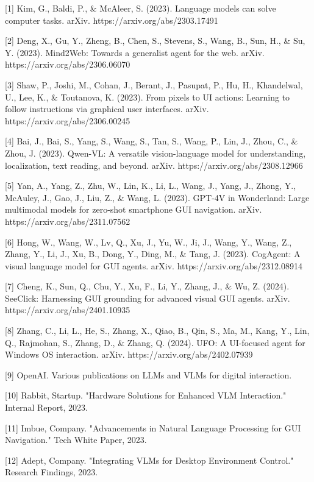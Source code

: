 \documentclass{article}
\begin{document}
{
\small
[1] Kim, G., Baldi, P., \& McAleer, S. (2023). Language models can solve computer tasks. arXiv. https://arxiv.org/abs/2303.17491


[2] Deng, X., Gu, Y., Zheng, B., Chen, S., Stevens, S., Wang, B., Sun, H., \& Su, Y. (2023). Mind2Web: Towards a generalist agent for the web. arXiv. https://arxiv.org/abs/2306.06070

[3] Shaw, P., Joshi, M., Cohan, J., Berant, J., Pasupat, P., Hu, H., Khandelwal, U., Lee, K., \& Toutanova, K. (2023). From pixels to UI actions: Learning to follow instructions via graphical user interfaces. arXiv. https://arxiv.org/abs/2306.00245

[4] Bai, J., Bai, S., Yang, S., Wang, S., Tan, S., Wang, P., Lin, J., Zhou, C., \& Zhou, J. (2023). Qwen-VL: A versatile vision-language model for understanding, localization, text reading, and beyond. arXiv. https://arxiv.org/abs/2308.12966

[5] Yan, A., Yang, Z., Zhu, W., Lin, K., Li, L., Wang, J., Yang, J., Zhong, Y., McAuley, J., Gao, J., Liu, Z., \& Wang, L. (2023). GPT-4V in Wonderland: Large multimodal models for zero-shot smartphone GUI navigation. arXiv. https://arxiv.org/abs/2311.07562

[6] Hong, W., Wang, W., Lv, Q., Xu, J., Yu, W., Ji, J., Wang, Y., Wang, Z., Zhang, Y., Li, J., Xu, B., Dong, Y., Ding, M., \& Tang, J. (2023). CogAgent: A visual language model for GUI agents. arXiv. https://arxiv.org/abs/2312.08914

[7] Cheng, K., Sun, Q., Chu, Y., Xu, F., Li, Y., Zhang, J., \& Wu, Z. (2024). SeeClick: Harnessing GUI grounding for advanced visual GUI agents. arXiv. https://arxiv.org/abs/2401.10935

[8] Zhang, C., Li, L., He, S., Zhang, X., Qiao, B., Qin, S., Ma, M., Kang, Y., Lin, Q., Rajmohan, S., Zhang, D., \& Zhang, Q. (2024). UFO: A UI-focused agent for Windows OS interaction. arXiv. https://arxiv.org/abs/2402.07939

[9] OpenAI. Various publications on LLMs and VLMs for digital interaction.

[10] Rabbit, Startup. "Hardware Solutions for Enhanced VLM Interaction." Internal Report, 2023.

[11] Imbue, Company. "Advancements in Natural Language Processing for GUI Navigation." Tech White Paper, 2023.

[12] Adept, Company. "Integrating VLMs for Desktop Environment Control." Research Findings, 2023.
}

\end{document}
